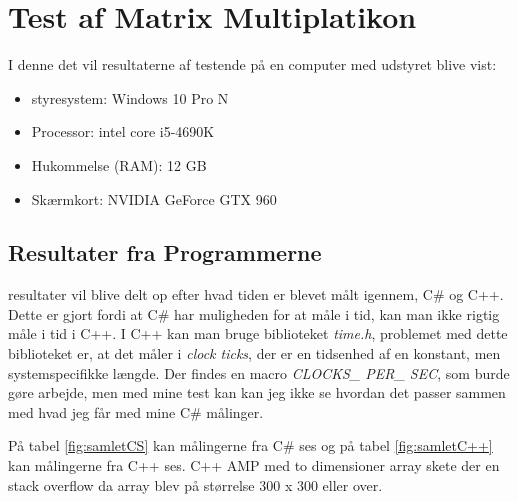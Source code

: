 \section{Test af Matrix Multiplatikon}
I denne det vil resultaterne af testende på en computer med udstyret blive vist:
\begin{itemize}
\item styresystem: Windows 10 Pro N
\item Processor: intel core i5-4690K
\item Hukommelse (RAM): 12 GB
\item Skærmkort: NVIDIA GeForce GTX 960
\end{itemize}

\subsection{Resultater fra Programmerne} \label{result_GPU_Funcalc}
resultater vil blive delt op efter hvad tiden er blevet målt igennem, C\# og C++. Dette er gjort fordi at C\# har muligheden for at måle i tid, kan man ikke rigtig måle i tid i C++. I C++ kan man bruge biblioteket \textit{time.h}, problemet med dette biblioteket er, at det måler i \textit{clock ticks}, der er en tidsenhed af en konstant, men systemspecifikke længde. Der findes en macro \textit{CLOCKS\_ PER\_ SEC}, som burde gøre arbejde, men med mine test kan kan jeg ikke se hvordan det passer sammen med hvad jeg får med mine C\# målinger.

På tabel \ref{fig:samletCS} kan målingerne fra C\# ses og på tabel \ref{fig:samletC++} kan målingerne fra C++ ses. C++ AMP med to dimensioner array skete der en stack overflow da array blev på størrelse 300 x 300 eller over.

